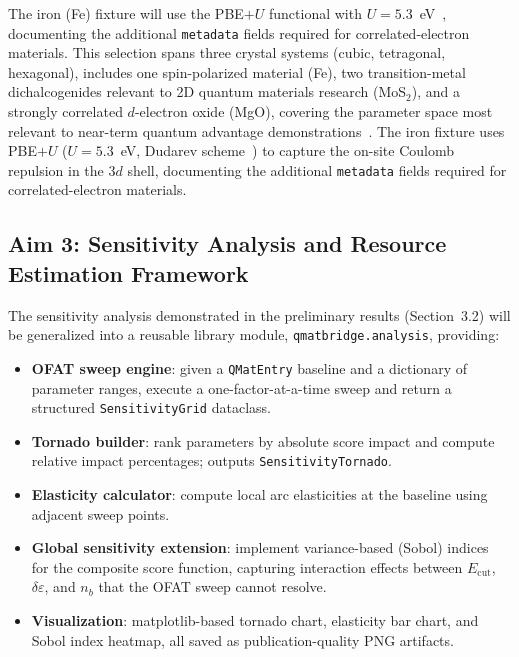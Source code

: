 \documentclass[11pt]{article}
\newcommand{\de}{\delta\varepsilon}
\newcommand{\Ecut}{E_{\mathrm{cut}}{}}
\newcommand{\nb}{{n_b}}
\begin{document}
The iron (Fe) fixture will use the PBE$+U$ functional with
$U = 5.3$~eV~\cite{Jain2013}, documenting the additional
\texttt{metadata} fields required for correlated-electron materials.
This selection spans three crystal systems (cubic, tetragonal, hexagonal),
includes one spin-polarized material (Fe), two transition-metal dichalcogenides
relevant to 2D quantum materials research (MoS$_2$), and a strongly
correlated $d$-electron oxide (MgO), covering the parameter space most
relevant to near-term quantum advantage demonstrations~\cite{Yoshioka2022}.
The iron fixture uses PBE$+U$ ($U = 5.3$~eV, Dudarev scheme~\cite{WangDFTU2006})
to capture the on-site Coulomb repulsion in the $3d$ shell, documenting the
additional \texttt{metadata} fields required for correlated-electron materials.

\subsection{Aim 3: Sensitivity Analysis and Resource Estimation Framework}

The sensitivity analysis demonstrated in the preliminary results
(Section~3.2) will be generalized into a reusable library module,
\texttt{qmatbridge.analysis}, providing:

\begin{itemize}[leftmargin=1.5em, itemsep=1pt]
  \item \textbf{OFAT sweep engine}: given a \texttt{QMatEntry} baseline
    and a dictionary of parameter ranges, execute a one-factor-at-a-time
    sweep and return a structured \texttt{SensitivityGrid} dataclass.
  \item \textbf{Tornado builder}: rank parameters by absolute score
    impact and compute relative impact percentages; outputs
    \texttt{SensitivityTornado}.
  \item \textbf{Elasticity calculator}: compute local arc elasticities
    at the baseline using adjacent sweep points.
  \item \textbf{Global sensitivity extension}: implement
    variance-based (Sobol) indices~\cite{Saltelli2008} for the composite
    score function, capturing interaction effects between $\Ecut$, $\de$,
    and $\nb$ that the OFAT sweep cannot resolve.
  \item \textbf{Visualization}: matplotlib-based tornado chart, elasticity
    bar chart, and Sobol index heatmap, all saved as publication-quality
    PNG artifacts.
\end{itemize}
\end{document}
